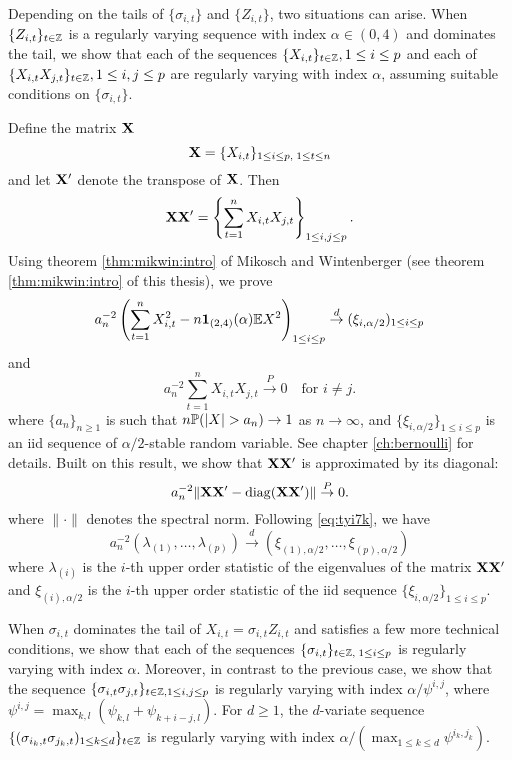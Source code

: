 Depending on the tails of $\{\sigma_{i,t}\}$ and $\{Z_{i,t}\}$,
two situations can arise. When $\{Z_{i,t}\}_{t \in \integers}$
is a regularly varying sequence with index $\alpha \in (0, 4)$
and dominates the tail, we show that each of the sequences
$\{X_{i,t}\}_{t \in \integers}, 1 \leq i \leq p$ and each of
$\{X_{i,t} X_{j,t}\}_{t \in \integers}, 1\leq i,j \leq p$
are regularly varying with index $\alpha$, assuming suitable
conditions on $\{\sigma_{i,t}\}$.

Define the matrix $\mtx X$
\[
\mtx X = \{X_{i,t}\}_{1 \leq i \leq p,\;1 \leq t \leq n}
\]
and let $\mtx X'$ denote the transpose of $\mtx X$. Then
\[
\mtx{XX'} =
\left\{\sum_{t=1}^n X_{i,t} X_{j,t}\right\}_{1 \leq i,j \leq p}.
\]
Using theorem \ref{thm:mikwin:intro} of Mikosch and Wintenberger
\cite{mikosch:wintenberger:2016}
(see theorem \ref{thm:mikwin:intro} of this thesis), we prove 
\[
a_n^{-2} \left(
\sum_{t=1}^n X_{i,t}^2 - n \I_{(2,4)}(\alpha) \E X^2
\right)_{1 \leq i \leq p}
\overset{d}{\to}
(\xi_{i, \alpha/2})_{1 \leq i \leq p}
\]
and
\[
a_n^{-2} \sum_{t=1}^n X_{i,t} X_{j,t} \overset{P}{\to} 0
\quad
\text{for } i \neq j.
\]
where $\{a_n\}_{n\geq 1}$ is such that $n\P(|X| > a_n) \to 1$
as $n \to \infty$,
and $\{\xi_{i, \alpha/2}\}_{1 \leq i \leq p}$ is an iid sequence of
$\alpha/2$-stable random variable.
See chapter \ref{ch:bernoulli} for details.
Built on this result, we show that $\mtx{XX'}$
is approximated by its diagonal:
\begin{equation}
  \label{eq:tyi7k}
  a_n^{-2} \|\mtx{X X'} - \diag(\mtx{X X'}) \|
  \overset{P}{\to} 0.
\end{equation}
where $\|\cdot\|$ denotes the spectral norm. Following
\eqref{eq:tyi7k}, we have
\[
a_n^{-2} (\lambda_{(1)}, \ldots, \lambda_{(p)})
\overset{d}{\to}
(\xi_{(1), \alpha/2}, \dots, \xi_{(p), \alpha/2})
\]
where $\lambda_{(i)}$ is the $i$-th upper order statistic of the
eigenvalues of the matrix $\mtx{XX'}$ and $\xi_{(i), \alpha/2}$ is
the $i$-th upper order statistic of the iid sequence
$\{\xi_{i, \alpha/2}\}_{1 \leq i \leq p}$.

When $\sigma_{i,t}$ dominates the tail of $X_{i,t} = \sigma_{i,t} Z_{i,t}$
and satisfies a few more
technical conditions, we show that each of the sequences
$\{\sigma_{i,t}\}_{t \in \integers,\; 1 \leq i \leq p}$
is regularly varying with index $\alpha$. Moreover, in contrast to the
previous case, we show that the sequence
$\{\sigma_{i,t} \sigma_{j,t}\}_{t \in \integers, 1 \leq i,j \leq p}$
is regularly varying with index $\alpha/\psi^{i,j}$, where
$\psi^{i,j} = \max_{k,l}(\psi_{k,l} + \psi_{k+i-j, l})$.
For $d \geq 1$, the $d$-variate sequence
$\{(\sigma_{i_k, t} \sigma_{j_k, t})_{1 \leq k \leq d}\}_{t \in \integers}$
is regularly varying with index
$\alpha /(\max_{1 \leq k \leq d} \psi^{i_k, j_k})$.

